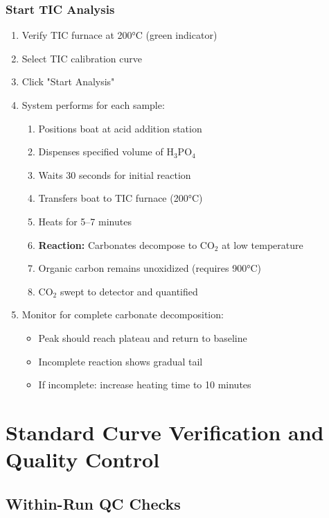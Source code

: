 \documentclass[11pt,a4paper]{article}\usepackage[]{graphicx}\usepackage[]{xcolor}
\begin{document}
\subsubsection{Start TIC Analysis}
\begin{enumerate}[noitemsep]
    \item Verify TIC furnace at 200°C (green indicator)
    \item Select TIC calibration curve
    \item Click "Start Analysis"
    \item System performs for each sample:
    \begin{enumerate}
        \item Positions boat at acid addition station
        \item Dispenses specified volume of H$_3$PO$_4$
        \item Waits 30 seconds for initial reaction
        \item Transfers boat to TIC furnace (200°C)
        \item Heats for 5--7 minutes
        \item \textbf{Reaction:} Carbonates decompose to CO$_2$ at low temperature
        \item Organic carbon remains unoxidized (requires 900°C)
        \item CO$_2$ swept to detector and quantified
    \end{enumerate}
    \item Monitor for complete carbonate decomposition:
    \begin{itemize}
        \item Peak should reach plateau and return to baseline
        \item Incomplete reaction shows gradual tail
        \item If incomplete: increase heating time to 10 minutes
    \end{itemize}
\end{enumerate}

\section{Standard Curve Verification and Quality Control}

\subsection{Within-Run QC Checks}
\end{document}
